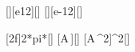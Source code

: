 [\tera\Hz][e12][\Hz]
[\pico\meter][e-12][\meter]

[2\pi f]{2*pi*\fX}[\per\second]
[A\,\omega]{\AX*\omX}[\mps]
[A\,\omega^2]{\AX*\omX^2}[\mpss]
